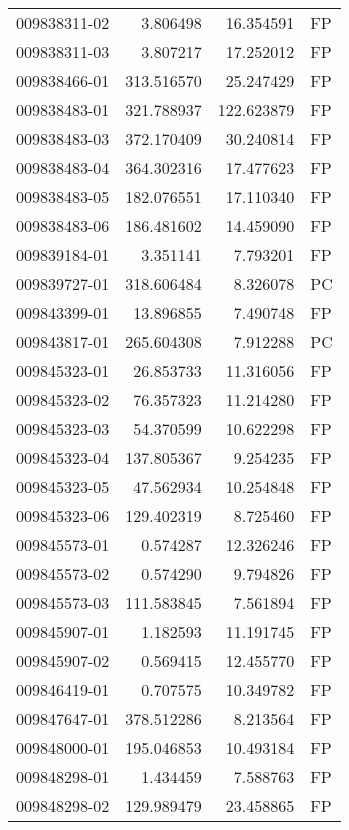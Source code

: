 \begin{tabular}{lrrl}
009838311-02 &    3.806498 &      16.354591 &   FP \\
009838311-03 &    3.807217 &      17.252012 &   FP \\
009838466-01 &  313.516570 &      25.247429 &   FP \\
009838483-01 &  321.788937 &     122.623879 &   FP \\
009838483-03 &  372.170409 &      30.240814 &   FP \\
009838483-04 &  364.302316 &      17.477623 &   FP \\
009838483-05 &  182.076551 &      17.110340 &   FP \\
009838483-06 &  186.481602 &      14.459090 &   FP \\
009839184-01 &    3.351141 &       7.793201 &   FP \\
009839727-01 &  318.606484 &       8.326078 &   PC \\
009843399-01 &   13.896855 &       7.490748 &   FP \\
009843817-01 &  265.604308 &       7.912288 &   PC \\
009845323-01 &   26.853733 &      11.316056 &   FP \\
009845323-02 &   76.357323 &      11.214280 &   FP \\
009845323-03 &   54.370599 &      10.622298 &   FP \\
009845323-04 &  137.805367 &       9.254235 &   FP \\
009845323-05 &   47.562934 &      10.254848 &   FP \\
009845323-06 &  129.402319 &       8.725460 &   FP \\
009845573-01 &    0.574287 &      12.326246 &   FP \\
009845573-02 &    0.574290 &       9.794826 &   FP \\
009845573-03 &  111.583845 &       7.561894 &   FP \\
009845907-01 &    1.182593 &      11.191745 &   FP \\
009845907-02 &    0.569415 &      12.455770 &   FP \\
009846419-01 &    0.707575 &      10.349782 &   FP \\
009847647-01 &  378.512286 &       8.213564 &   FP \\
009848000-01 &  195.046853 &      10.493184 &   FP \\
009848298-01 &    1.434459 &       7.588763 &   FP \\
009848298-02 &  129.989479 &      23.458865 &   FP \\

\end{tabular}

